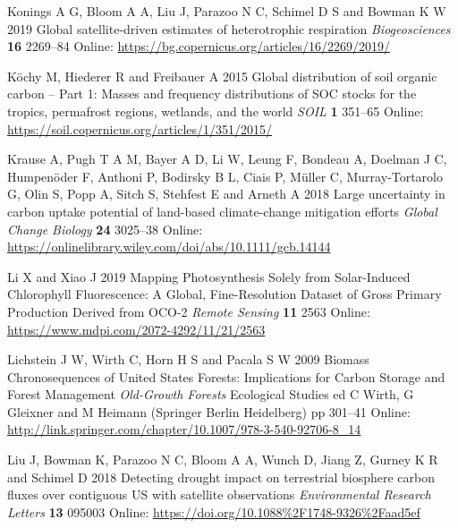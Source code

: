 \documentclass[
]{article}
\newlength{\cslhangindent}
\newenvironment{cslreferences}%
  {\setlength{\parindent}{0pt}%
  \everypar{\setlength{\hangindent}{\cslhangindent}}\ignorespaces}%
  {\par}
\begin{document}
\begin{cslreferences}
\leavevmode\hypertarget{ref-konings_global_2019}{}%
Konings A G, Bloom A A, Liu J, Parazoo N C, Schimel D S and Bowman K W
2019 Global satellite-driven estimates of heterotrophic respiration
\emph{Biogeosciences} \textbf{16} 2269--84 Online:
\url{https://bg.copernicus.org/articles/16/2269/2019/}

\leavevmode\hypertarget{ref-kochy_global_2015}{}%
Köchy M, Hiederer R and Freibauer A 2015 Global distribution of soil
organic carbon -- Part 1: Masses and frequency distributions of SOC
stocks for the tropics, permafrost regions, wetlands, and the world
\emph{SOIL} \textbf{1} 351--65 Online:
\url{https://soil.copernicus.org/articles/1/351/2015/}

\leavevmode\hypertarget{ref-krause_large_2018}{}%
Krause A, Pugh T A M, Bayer A D, Li W, Leung F, Bondeau A, Doelman J C,
Humpenöder F, Anthoni P, Bodirsky B L, Ciais P, Müller C,
Murray‐Tortarolo G, Olin S, Popp A, Sitch S, Stehfest E and Arneth A
2018 Large uncertainty in carbon uptake potential of land-based
climate-change mitigation efforts \emph{Global Change Biology}
\textbf{24} 3025--38 Online:
\url{https://onlinelibrary.wiley.com/doi/abs/10.1111/gcb.14144}

\leavevmode\hypertarget{ref-li_mapping_2019}{}%
Li X and Xiao J 2019 Mapping Photosynthesis Solely from Solar-Induced
Chlorophyll Fluorescence: A Global, Fine-Resolution Dataset of Gross
Primary Production Derived from OCO-2 \emph{Remote Sensing} \textbf{11}
2563 Online: \url{https://www.mdpi.com/2072-4292/11/21/2563}

\leavevmode\hypertarget{ref-lichstein_biomass_2009}{}%
Lichstein J W, Wirth C, Horn H S and Pacala S W 2009 Biomass
Chronosequences of United States Forests: Implications for Carbon
Storage and Forest Management \emph{Old-Growth Forests} Ecological
Studies ed C Wirth, G Gleixner and M Heimann (Springer Berlin
Heidelberg) pp 301--41 Online:
\url{http://link.springer.com/chapter/10.1007/978-3-540-92706-8_14}

\leavevmode\hypertarget{ref-liu_detecting_2018}{}%
Liu J, Bowman K, Parazoo N C, Bloom A A, Wunch D, Jiang Z, Gurney K R
and Schimel D 2018 Detecting drought impact on terrestrial biosphere
carbon fluxes over contiguous US with satellite observations
\emph{Environmental Research Letters} \textbf{13} 095003 Online:
\url{https://doi.org/10.1088\%2F1748-9326\%2Faad5ef}


\end{cslreferences}
\end{document}
